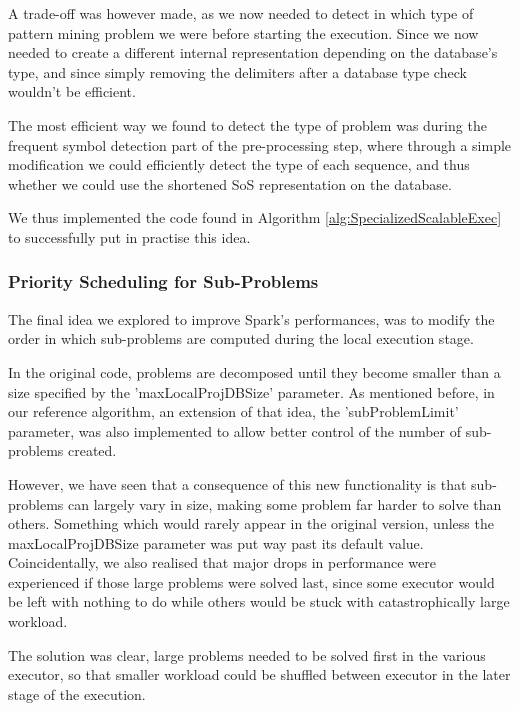 \documentclass{eplmastersthesis}
\begin{document}
A trade-off was however made, as we now needed to detect in which type of pattern mining problem we were before starting the execution. Since we now needed to create a different internal representation depending on the database's type, and since simply removing the delimiters after a database type check wouldn't be efficient. \newline

The most efficient way we found to detect the type of problem was during the frequent symbol detection part of the pre-processing step, where through a simple modification we could efficiently detect the type of each sequence, and thus whether we could use the shortened \acrshort{SoS} representation on the database. \newline

We thus implemented the code found in Algorithm \ref{alg:SpecializedScalableExec} to successfully put in practise this idea.

\subsubsection{Priority Scheduling for Sub-Problems}

The final idea we explored to improve Spark's performances, was to modify the order in which sub-problems are computed during the local execution stage. \newline

In the original code, problems are decomposed until they become smaller than a size specified by the 'maxLocalProjDBSize' parameter. As mentioned before, in our reference algorithm, an extension of that idea, the 'subProblemLimit' parameter, was also implemented to allow better control of the number of sub-problems created. \newline

However, we have seen that a consequence of this new functionality is that sub-problems can largely vary in size, making some problem far harder to solve than others. Something which would rarely appear in the original version, unless the maxLocalProjDBSize parameter was put way past its default value. Coincidentally, we also realised that major drops in performance were experienced if those large problems were solved last, since some executor would be left with nothing to do while others would be stuck with catastrophically large workload.
\newline

The solution was clear, large problems needed to be solved first in the various executor, so that smaller workload could be shuffled between executor in the later stage of the execution.
\end{document}

